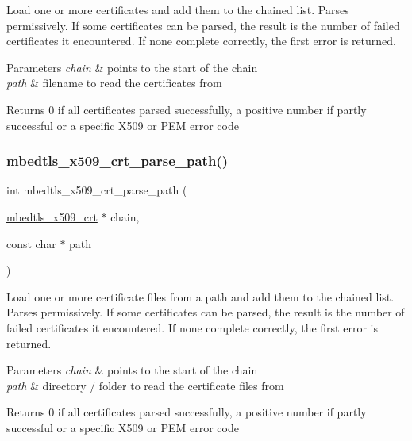 Load one or more certificates and add them to the chained list. Parses permissively. If some certificates can be parsed, the result is the number of failed certificates it encountered. If none complete correctly, the first error is returned. 


\begin{DoxyParams}{Parameters}
{\em chain} & points to the start of the chain \\
\hline
{\em path} & filename to read the certificates from\\
\hline
\end{DoxyParams}
\begin{DoxyReturn}{Returns}
0 if all certificates parsed successfully, a positive number if partly successful or a specific X509 or P\+EM error code 
\end{DoxyReturn}
\mbox{\label{group__x509__module_ga571fc89b9f3217ab3dd67bd7af905066}} 
\subsubsection{\texorpdfstring{mbedtls\+\_\+x509\+\_\+crt\+\_\+parse\+\_\+path()}{mbedtls\_x509\_crt\_parse\_path()}}
{\footnotesize\ttfamily int mbedtls\+\_\+x509\+\_\+crt\+\_\+parse\+\_\+path (\begin{DoxyParamCaption}\item[{\mbox{\hyperlink{structmbedtls__x509__crt}{mbedtls\+\_\+x509\+\_\+crt}} $\ast$}]{chain,  }\item[{const char $\ast$}]{path }\end{DoxyParamCaption})}



Load one or more certificate files from a path and add them to the chained list. Parses permissively. If some certificates can be parsed, the result is the number of failed certificates it encountered. If none complete correctly, the first error is returned. 


\begin{DoxyParams}{Parameters}
{\em chain} & points to the start of the chain \\
\hline
{\em path} & directory / folder to read the certificate files from\\
\hline
\end{DoxyParams}
\begin{DoxyReturn}{Returns}
0 if all certificates parsed successfully, a positive number if partly successful or a specific X509 or P\+EM error code 
\end{DoxyReturn}
\mbox{\label{group__x509__module_ga98ed4504e4f832b735a230acf54fcde3}} 
